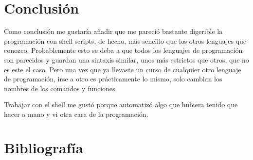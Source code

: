 \documentclass[a4paper]{article}
\begin{document}
\section{Conclusión}
Como conclusión me gustaría añadir que me pareció bastante digerible la programación con shell scripts, de hecho, más sencillo que los otros lenguajes que conozco. Probablemente esto se deba a que todos los lenguajes de programación son parecidos y guardan una sintaxis similar, unos más estrictos que otros, que no es este el caso. Pero una vez que ya llevaste un curso de cualquier otro lenguaje de programación, irse a otro es prácticamente lo mismo, solo cambian los nombres de los comandos y funciones. 

Trabajar con el shell me gustó porque automatizó algo que hubiera tenido que hacer a mano y vi otra cara de la programación.

\section{Bibliografía}
\end{document}
